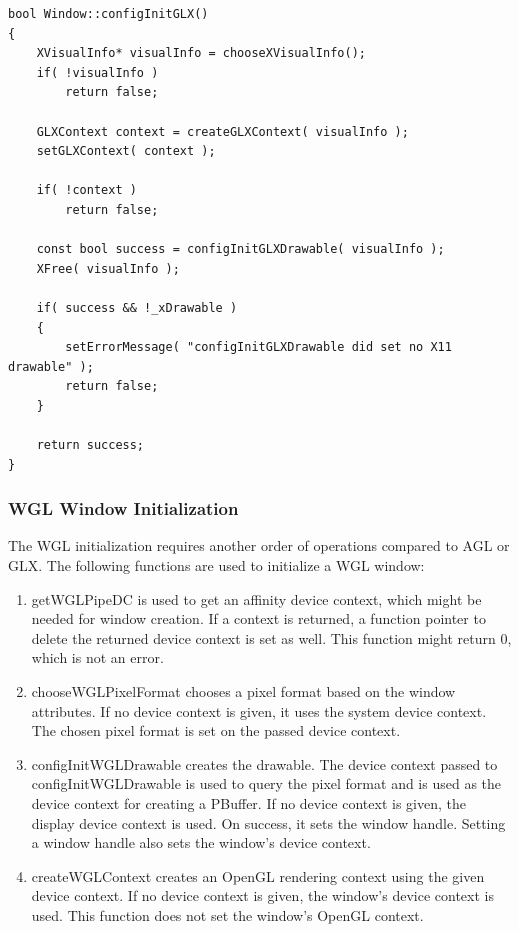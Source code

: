 \documentclass[10pt,a4]{scrartcl}
\begin{document}
{\footnotesize\begin{lstlisting}
bool Window::configInitGLX()
{
    XVisualInfo* visualInfo = chooseXVisualInfo();
    if( !visualInfo )
        return false;

    GLXContext context = createGLXContext( visualInfo );
    setGLXContext( context );

    if( !context )
        return false;

    const bool success = configInitGLXDrawable( visualInfo );
    XFree( visualInfo );

    if( success && !_xDrawable )
    {
        setErrorMessage( "configInitGLXDrawable did set no X11 drawable" );
        return false;
    }

    return success;    
}
\end{lstlisting}}


\subsubsection{WGL Window Initialization}

The WGL initialization requires another order of operations compared to
AGL or GLX. The following functions are used to initialize a WGL window:

\begin{enumerate}
\item\textsf{getWGLPipeDC} is used to get an affinity device context,
  which might be needed for window creation. If a context is returned, a
  function pointer to delete the returned device context is set as
  well. This function might return 0, which is not an error.
\item\textsf{chooseWGLPixelFormat} chooses a pixel format based on the
  window attributes. If no device context is given, it uses the system
  device context. The chosen pixel format is set on the passed device
  context.
\item\textsf{configInitWGLDrawable} creates the drawable. The device
  context passed to \textsf{configInitWGLDrawable} is used to query the
  pixel format and is used as the device context for creating a
  PBuffer. If no device context is given, the display device context is
  used. On success, it sets the window handle. Setting a window handle
  also sets the window's device context.
\item\textsf{createWGLContext} creates an OpenGL rendering context using
  the given device context. If no device context is given, the window's
  device context is used. This function does not set the window's OpenGL
  context.
\end{enumerate}
\end{document}
